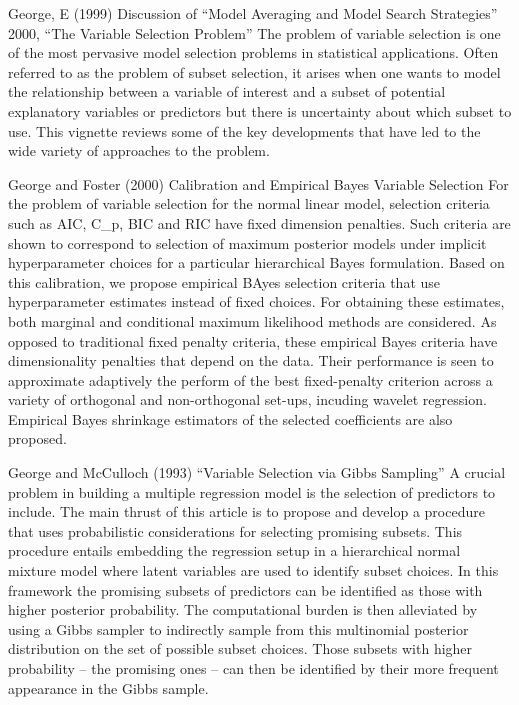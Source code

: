 \documentclass{amsart}[12pt]
\begin{document}
George, E (1999) Discussion of ``Model Averaging and Model Search Strategies''
2000, ``The Variable Selection Problem''
The problem of variable selection is one of the most pervasive model selection problems in statistical
applications. Often referred to as the problem of subset selection, it arises when one wants to model the
relationship between a variable of interest and a subset of potential explanatory variables or predictors but
there is uncertainty about which subset to use. This vignette reviews some of the key developments that have led 
to the wide variety of approaches to the problem.

George and Foster (2000) Calibration and Empirical Bayes Variable Selection
For the problem of variable selection for the normal linear model, selection criteria such as AIC, C_p, BIC
and RIC have fixed dimension penalties. Such criteria are shown to correspond to selection of maximum
posterior models under implicit hyperparameter choices for a particular hierarchical Bayes formulation. Based
on this calibration, we propose empirical BAyes selection criteria that use hyperparameter estimates instead
of fixed choices. For obtaining these estimates, both marginal and conditional maximum likelihood methods are
considered. As opposed to traditional fixed penalty criteria, these empirical Bayes criteria have dimensionality
penalties that depend on the data. Their performance is seen to approximate adaptively the perform of the best
fixed-penalty criterion across a variety of orthogonal and non-orthogonal set-ups, incuding wavelet regression.
Empirical Bayes shrinkage estimators of the selected coefficients are also proposed.

George and McCulloch (1993) ``Variable Selection via Gibbs Sampling''
A crucial problem in building a multiple regression model is the selection of predictors to include. The main
thrust of this article is to propose and develop a procedure that uses probabilistic considerations for selecting
promising subsets. This procedure entails embedding the regression setup in a hierarchical normal mixture model 
where latent variables are used to identify subset choices. In this framework the promising subsets of predictors
can be identified as those with higher posterior probability. The computational burden is then alleviated by
using a Gibbs sampler to indirectly sample from this multinomial posterior distribution on the set of possible
subset choices. Those subsets with higher probability -- the promising ones -- can then be identified by their
more frequent appearance in the Gibbs sample.
\end{document}
